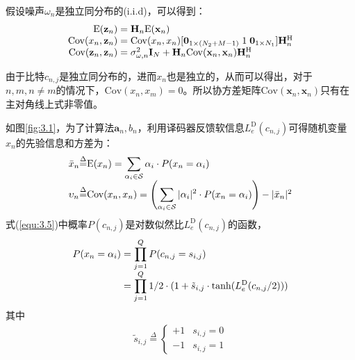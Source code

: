 假设噪声$\omega_n$是独立同分布的(i.i.d)，可以得到：
\begin{eqnarray}
    \begin{array}{r@{\;=\;}l}
        \mathrm{E}(\mathbf{z}_n)&\mathbf{H}_n\mathrm{E}(\mathbf{x}_n)\\
        \mathrm{Cov}(x_n,\mathbf{z}_n)&\mathrm{Cov}(x_n,x_n)[\mathbf{0}_{1\times(N_2+M-1)}\;1\;\mathbf{0}_{1\times
        N_1}]\mathbf{H}_n^{\mathrm{H}}\\
        \mathrm{Cov}(\mathbf{z}_n,\mathbf{z}_n)&\sigma_{\omega,n}^2\mathbf{I}_N+\mathbf{H}_n\mathrm{Cov}(\mathbf{x}_n,\mathbf{x}_n)\mathbf{H}_n^{\mathrm{H}}\\
    \end{array}
    \label{equ:3.6}
\end{eqnarray}

由于比特$c_{n,j}$是独立同分布的，进而$x_n$也是独立的，从而可以得出，对于$n,m,n\neq
m$的情况下，$\mathrm{Cov}(x_n,x_m)=0$。所以协方差矩阵$\mathrm{Cov}(\mathbf{x}_n,\mathbf{x}_n)$只有在主对角线上式非零值。

如图\ref{fig:3.1}，为了计算法$\mathbf{a}_n,b_n$，利用译码器反馈软信息$L_e^{\mathrm{D}}(c_{n,j})$可得随机变量$x_n$的先验信息和方差为：
\begin{eqnarray}
    \begin{array}{l@{\overset{\Delta}{=}}l}
        \bar{x}_n&\mathrm{E}(x_n)=\displaystyle\sum_{\alpha_i\in
        \mathcal{S}}\alpha_i\cdot P(x_n=\alpha_i)\\
        \upsilon_n&\mathrm{Cov}(x_n,x_n)=\left(\displaystyle\sum_{\alpha_i\in
        \mathcal{S}}|\alpha_i|^2\cdot P(x_n=\alpha_i)\right)-|\bar{x}_n|^2
    \end{array}
    \label{equ:3.7}
\end{eqnarray}
式(\ref{equ:3.5})中概率$P(c_{n,j})$是对数似然比$L_e^{\mathrm{D}}(c_{n,j})$的函数，
\begin{eqnarray}
    \begin{array}{l@{\;=\;}l}
        \displaystyle
        P(x_n=\alpha_i)&\displaystyle\prod_{j=1}^{Q}P(c_{n,j}=s_{i,j})\\
        &\displaystyle\prod_{j=1}^Q1/2\cdot(1+\tilde{s}_{i,j}\cdot\tanh(L_e^{\mathrm{D}}(c_{n,j}/2)))
    \end{array}
    \label{equ:3.8}
\end{eqnarray}
其中
\begin{eqnarray}
    \tilde{s}_{i,j}\overset{\Delta}{=}
    \left\{
    \begin{matrix}
        +1&s_{i,j}=0\\
        -1&s_{i,j}=1
    \end{matrix}
    \right.
    \label{equ:3.9}
\end{eqnarray}

